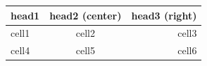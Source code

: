 \begin{tabular}{ l c r }
\hline
head1 & head2 (center) & head3 (right) \\
\hline
cell1 & cell2 & cell3 \\
cell4 & cell5 & cell6 \\
\hline
\end{tabular}
